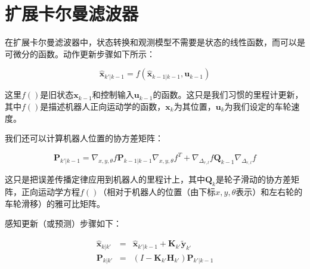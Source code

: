 \section {扩展卡尔曼滤波器} 
\label{sec:EKF}
在扩展卡尔曼滤波器中，状态转换和观测模型不需要是状态的线性函数，而可以是可微分的函数。动作更新步骤如下所示：

\begin{equation}
\hat{\boldsymbol{x}}_{k'|k-1} = f(\hat{\boldsymbol{x}}_{k-1|k-1}, \boldsymbol{u}_{k-1})
\end{equation}



这里$f()$是旧状态$\boldsymbol{x}_{k-1}$和控制输入$\boldsymbol{u}_{k-1}$的函数。这只是我们习惯的里程计更新，其中$f()$是描述机器人正向运动学的函数，$\boldsymbol{x}_k$为其位置，$\boldsymbol{u}_k$为我们设定的车轮速度。

我们还可以计算机器人位置的协方差矩阵：

\begin{equation}
\boldsymbol{P}_{k'|k-1} = \nabla_{x,y,\theta}f \boldsymbol{P}_{k-1|k-1}\nabla_{x,y,\theta}f^T + \nabla_{\Delta_{r,l}}f\boldsymbol{Q}_{k-1}\nabla_{\Delta_{r,l}}f
\end{equation}


这只是把误差传播定律应用到机器人的里程计上，其中$\boldsymbol{Q}_k$是轮子滑动的协方差矩阵，正向运动学方程$f()$（相对于机器人的位置（由下标$x,y,\theta$表示）和左右轮的车轮滑移）的雅可比矩阵。


感知更新（或预测）步骤如下：

\begin{eqnarray}
\hat{\boldsymbol{x}}_{k|k'} &=& \hat{\boldsymbol{x}}_{k'|k-1} + \boldsymbol{K}_{k'}\tilde{\boldsymbol{y}}_{k'}\\
\boldsymbol{P}_{k|k'} &=& (I - \boldsymbol{K}_{k'} {\boldsymbol{H}_{k'}}) \boldsymbol{P}_{k'|k-1}
\end{eqnarray}

